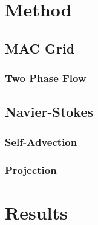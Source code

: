 \documentclass[]{report}   %
\begin{document}
\chapter{Method}
\section{MAC Grid}

\subsection{Two Phase Flow}

\section{Navier-Stokes}
\subsection{Self-Advection}

\subsection{Projection}

\chapter{Results}



\endgroup



\end{document}
